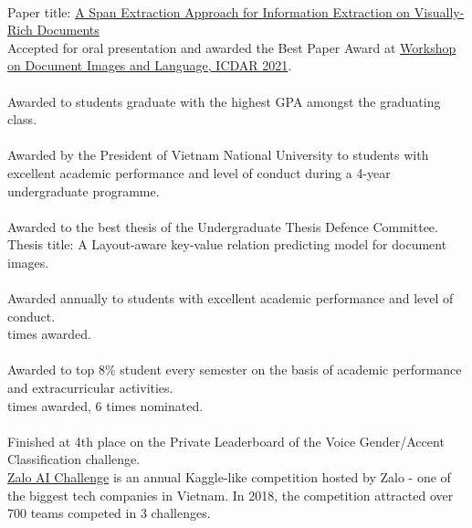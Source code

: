 \\
Paper title: \href{https://aps.arxiv.org/abs/2106.00978}{A Span Extraction Approach for Information Extraction on Visually-Rich Documents}\\
\indent Accepted for oral presentation and awarded the Best Paper Award at \href{https://dil2021.github.io/index.html}{Workshop on Document Images and Language, ICDAR 2021}.\\

\\
Awarded to students graduate with the highest GPA amongst the graduating
class.\\

\\
Awarded by the President of Vietnam National University to students with
excellent academic performance and level of conduct during a 4-year
undergraduate programme.\\

\\
Awarded to the best thesis of the Undergraduate Thesis Defence Committee.\\
\indent Thesis title: A Layout-aware key-value relation predicting model for
document images.\\

\\
Awarded annually to students with excellent academic performance and level of conduct.\\
 times awarded.\\

\\
Awarded to top 8\% student every semester on the basis of academic performance and extracurricular activities.\\
 times awarded, 6 times nominated.\\

\\
Finished at 4th place on the Private Leaderboard of the Voice Gender/Accent Classification challenge.\\
\indent \href{https://challenge.zalo.ai}{Zalo AI Challenge} is an annual Kaggle-like competition hosted
by Zalo - one of the biggest tech companies in Vietnam. In 2018, the competition attracted
over 700 teams competed in 3 challenges.\\


